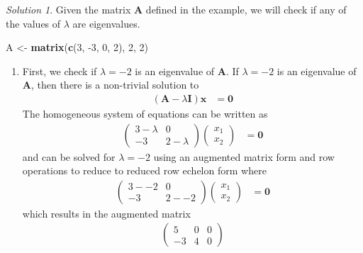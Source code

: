 \documentclass[
]{book}
\newenvironment{Shaded}{\begin{snugshade}}{\end{snugshade}}
\newcommand{\DecValTok}[1]{\textcolor[rgb]{0.00,0.00,0.81}{#1}}
\newcommand{\KeywordTok}[1]{\textcolor[rgb]{0.13,0.29,0.53}{\textbf{#1}}}
\newcommand{\NormalTok}[1]{#1}
\newcommand{\StringTok}[1]{\textcolor[rgb]{0.31,0.60,0.02}{#1}}
\providecommand{\tightlist}{%
  \setlength{\itemsep}{0pt}\setlength{\parskip}{0pt}}
\theoremstyle{definition}
\theoremstyle{definition}
\theoremstyle{definition}
\theoremstyle{definition}
\theoremstyle{remark}
\newtheorem*{solution}{Solution}
\begin{document}
\begin{solution}
Given the matrix \(\mathbf{A}\) defined in the example, we will check if any of the values of \(\lambda\) are eigenvalues.

\begin{Shaded}
\begin{Highlighting}[]
\NormalTok{A <-}\StringTok{  }\KeywordTok{matrix}\NormalTok{(}\KeywordTok{c}\NormalTok{(}\DecValTok{3}\NormalTok{, }\DecValTok{-3}\NormalTok{, }\DecValTok{0}\NormalTok{, }\DecValTok{2}\NormalTok{), }\DecValTok{2}\NormalTok{, }\DecValTok{2}\NormalTok{)}
\end{Highlighting}
\end{Shaded}

\begin{enumerate}
\def\labelenumi{\alph{enumi})}
\tightlist
\item
  First, we check if \(\lambda = -2\) is an eigenvalue of \(\mathbf{A}\). If \(\lambda = -2\) is an eigenvalue of \(\mathbf{A}\), then there is a non-trivial solution to
  \[
  \begin{aligned}
  \left( \mathbf{A} - \lambda\mathbf{I} \right) \mathbf{x} & = \mathbf{0}
  \end{aligned}
  \]
  The homogeneous system of equations can be written as
  \[
  \begin{aligned}
  \begin{pmatrix} 
  3  - \lambda & 0 \\
  -3 & 2 - \lambda 
  \end{pmatrix} \begin{pmatrix} x_1 \\ x_2 \end{pmatrix} & = \mathbf{0}
  \end{aligned}
  \]
  and can be solved for \(\lambda = -2\) using an augmented matrix form and row operations to reduce to reduced row echelon form where
  \[
  \begin{aligned}
  \begin{pmatrix} 
  3  - -2 & 0 \\
  -3 & 2 - -2
  \end{pmatrix} \begin{pmatrix} x_1 \\ x_2 \end{pmatrix} & = \mathbf{0}
  \end{aligned}
  \]
  which results in the augmented matrix
  \[
  \begin{aligned}
  \begin{pmatrix} 5 & 0 & 0 \\ -3 & 4 & 0 \end{pmatrix}

\end{aligned}\]
\end{enumerate}
\end{solution}
\end{document}
